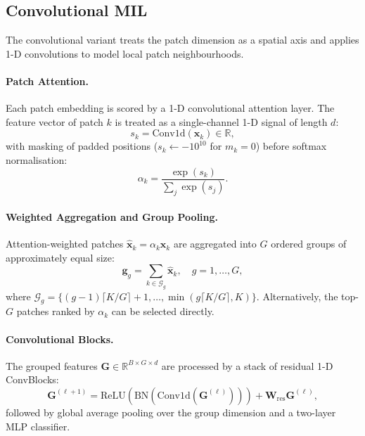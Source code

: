 \documentclass[11pt,a4paper]{article}
\begin{document}
\subsection{Convolutional MIL}
\label{sec:conv}

The convolutional variant treats the patch dimension as a spatial axis and
applies 1-D convolutions to model local patch neighbourhoods.

\paragraph{Patch Attention.}
Each patch embedding is scored by a 1-D convolutional attention layer.
The feature vector of patch $k$ is treated as a single-channel 1-D signal of
length $d$:
\begin{equation}
  s_k = \text{Conv1d}(\mathbf{x}_k) \in \mathbb{R},
\end{equation}
with masking of padded positions ($s_k \leftarrow -10^{10}$ for $m_k = 0$)
before softmax normalisation:
\begin{equation}
  \alpha_k = \frac{\exp(s_k)}{\sum_{j} \exp(s_j)}.
\end{equation}

\paragraph{Weighted Aggregation and Group Pooling.}
Attention-weighted patches $\hat{\mathbf{x}}_k = \alpha_k \mathbf{x}_k$ are
aggregated into $G$ ordered groups of approximately equal size:
\begin{equation}
  \mathbf{g}_g = \sum_{k \in \mathcal{G}_g} \hat{\mathbf{x}}_k,
  \quad g = 1, \ldots, G,
\end{equation}
where $\mathcal{G}_g = \{(g-1)\lceil K/G \rceil + 1, \ldots, \min(g\lceil K/G\rceil, K)\}$.
Alternatively, the top-$G$ patches ranked by $\alpha_k$ can be selected directly.

\paragraph{Convolutional Blocks.}
The grouped features $\mathbf{G} \in \mathbb{R}^{B \times G \times d}$ are
processed by a stack of residual 1-D ConvBlocks:
\begin{equation}
  \mathbf{G}^{(\ell+1)} = \text{ReLU}\!\left(\text{BN}\!\left(\text{Conv1d}(\mathbf{G}^{(\ell)})\right)\right) + \mathbf{W}_{\text{res}}\mathbf{G}^{(\ell)},
\end{equation}
followed by global average pooling over the group dimension and a two-layer
MLP classifier.
\end{document}
